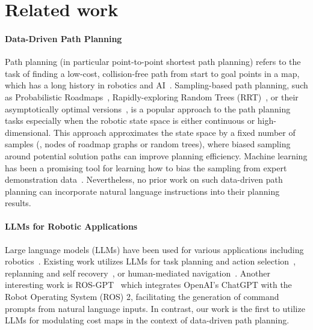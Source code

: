 \section{Related work}
\paragraph{Data-Driven Path Planning}
Path planning (in particular point-to-point shortest path planning) refers to the task of finding a low-cost, collision-free path from start to goal points in a map, which has a long history in robotics and AI~\cite{hart1968formal,abd2015comprehensive,gonzalez2015review}. Sampling-based path planning, such as Probabilistic Roadmaps~\cite{kavraki1996probabilistic}, Rapidly-exploring Random Trees (RRT)~\cite{lavalle1998rapidly}, or their asymptotically optimal versions~\cite{karaman2011sampling}, is a popular approach to the path planning tasks especially when the robotic state space is either continuous or high-dimensional. This approach approximates the state space by a fixed number of samples (\ie, nodes of roadmap graphs or random trees), where biased sampling around potential solution paths can improve planning efficiency. Machine learning has been a promising tool for learning how to bias the sampling from expert demonstration data~\cite{ichter2018learning,chen2019learning,ichter2020learned}. Nevertheless, no prior work on such data-driven path planning can incorporate natural language instructions into their planning results.

\paragraph{LLMs for Robotic Applications}
Large language models (LLMs) have been used for various applications including robotics~\cite{zeng2023large}. Existing work utilizes LLMs for task planning and action selection~\cite{ahn2022can,joublin2024copal,hu2024deploying,liu2023llmp}, replanning and self recovery~\cite{shirasaka2023selfrecovery,skreta2024replan}, or human-mediated navigation~\cite{xiao2023llm,dai2024think}. Another interesting work is ROS-GPT~\cite{koubaa2023rosgpt} which integrates OpenAI's ChatGPT with the Robot Operating System (ROS) 2, facilitating the generation of command prompts from natural language inputs. In contrast, our work is the first to utilize LLMs for modulating cost maps in the context of data-driven path planning.